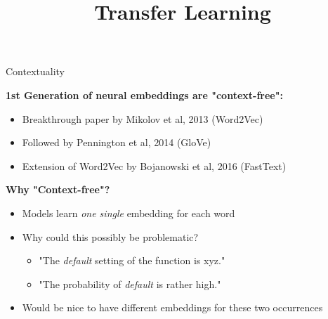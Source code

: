 



\newcommand{\titlefigure}{figure/ulmfit_sq.png}
\newcommand{\learninggoals}{
\item tbd}

\title{Transfer Learning}
\date{}




\begin{vbframe}{Contextuality}

\vfill

\textbf{1st Generation of neural embeddings are "context-free":}

	\begin{itemize}
		\item Breakthrough paper by Mikolov et al, 2013 (Word2Vec)
		\item Followed by Pennington et al, 2014 (GloVe)
		\item Extension of Word2Vec by Bojanowski et al, 2016 (FastText)
	\end{itemize}
	
	\textbf{Why "Context-free"?}
	
	\begin{itemize}
		\item Models learn \textit{one single} embedding for each word
		\item Why could this possibly be problematic?
			\begin{itemize}
				\item "The \textit{default} setting of the function is xyz."
				\item "The probability of \textit{default} is rather high."
			\end{itemize}
		\item Would be nice to have different embeddings for these two occurrences
	\end{itemize}
	
\vfill

\end{vbframe}


